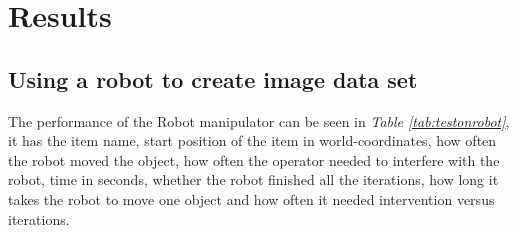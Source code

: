 \chapter{Results}

\section{Using a robot to create image data set}\label{resrobotcontrol}
The performance of the Robot manipulator can be seen in \textit{Table \ref{tab:testonrobot}}, it has the item name, start position of the item in world-coordinates, how often the robot moved the object, how often the operator needed to interfere with the robot, time in seconds, whether the robot finished all the iterations, how long it takes the robot to move one object and how often it needed intervention versus iterations. 



